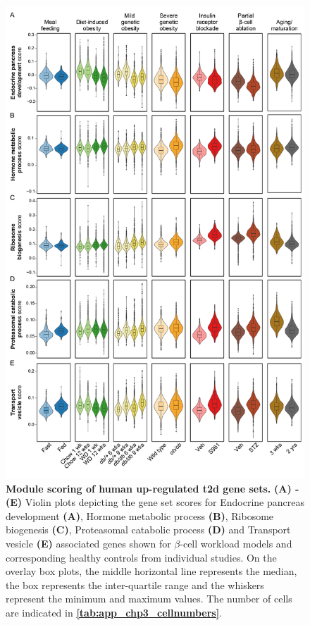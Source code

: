 \begin{figure}
  \centering
  \includegraphics[width=0.6\linewidth]{Appendix2/Fig/F3-21-01.png}
  \vspace{-150pt}
  \caption[Module scoring of human up-regulated  gene sets]{\textbf{Module scoring of human up-regulated \gls{t2d} gene sets.} \textbf{(A) - (E)} Violin plots depicting the gene set scores for Endocrine pancreas development \textbf{(A)}, Hormone metabolic process \textbf{(B)}, Ribosome biogenesis \textbf{(C)}, Proteasomal catabolic process \textbf{(D)} and Transport vesicle \textbf{(E)} associated genes shown for $\beta$-cell workload models and corresponding healthy controls from individual studies. On the overlay box plots, the middle horizontal line represents the median, the box represents the inter-quartile range and the whiskers represent the minimum and maximum values. The number of cells are indicated in \textbf{\autoref{tab:app_chp3_cellnumbers}}.}
  \label{fig:app_chp3_humant2d}
\end{figure}




